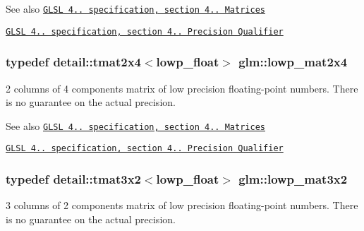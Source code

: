 \begin{DoxySeeAlso}{\-See also}
\href{http://www.opengl.org/registry/doc/GLSLangSpec.4.20.8.pdf}{\tt \-G\-L\-S\-L 4.. specification, section 4.. \-Matrices} 

\href{http://www.opengl.org/registry/doc/GLSLangSpec.4.20.8.pdf}{\tt \-G\-L\-S\-L 4.. specification, section 4.. \-Precision \-Qualifier} 
\end{DoxySeeAlso}
\hypertarget{group__core__precision_ga800238e68eee3279c7a38d4f3cd005e8}{
\subsubsection[{lowp\-\_\-mat2x4}]{\setlength{\rightskip}{0pt plus 5cm}typedef detail\-::tmat2x4$<$lowp\-\_\-float$>$ {\bf glm\-::lowp\-\_\-mat2x4}}}\label{group__core__precision_ga800238e68eee3279c7a38d4f3cd005e8}
2 columns of 4 components matrix of low precision floating-\/point numbers. \-There is no guarantee on the actual precision.

\begin{DoxySeeAlso}{\-See also}
\href{http://www.opengl.org/registry/doc/GLSLangSpec.4.20.8.pdf}{\tt \-G\-L\-S\-L 4.. specification, section 4.. \-Matrices} 

\href{http://www.opengl.org/registry/doc/GLSLangSpec.4.20.8.pdf}{\tt \-G\-L\-S\-L 4.. specification, section 4.. \-Precision \-Qualifier} 
\end{DoxySeeAlso}
\hypertarget{group__core__precision_ga590ba3600da3c6dc36a0eb7574cbd6f6}{
\subsubsection[{lowp\-\_\-mat3x2}]{\setlength{\rightskip}{0pt plus 5cm}typedef detail\-::tmat3x2$<$lowp\-\_\-float$>$ {\bf glm\-::lowp\-\_\-mat3x2}}}\label{group__core__precision_ga590ba3600da3c6dc36a0eb7574cbd6f6}
3 columns of 2 components matrix of low precision floating-\/point numbers. \-There is no guarantee on the actual precision.

